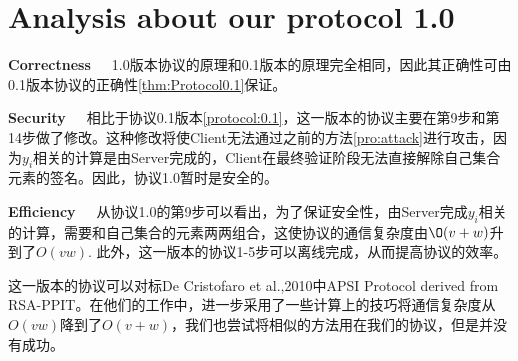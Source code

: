 \section{Analysis about our protocol 1.0}
\noindent\textbf{Correctness}~~~1.0版本协议的原理和0.1版本的原理完全相同，因此其正确性可由0.1版本协议的正确性\ref{thm:Protocol0.1}保证。

\noindent\textbf{Security}~~~相比于协议0.1版本\ref{protocol:0.1}，这一版本的协议主要在第9步和第14步做了修改。这种修改将使Client无法通过之前的方法\ref{pro:attack}进行攻击，因为$y_i$相关的计算是由Server完成的，Client在最终验证阶段无法直接解除自己集合元素的签名。因此，协议1.0暂时是安全的。

\noindent\textbf{Efficiency}~~~从协议1.0的第9步可以看出，为了保证安全性，由Server完成$y_i$相关的计算，需要和自己集合的元素两两组合，这使协议的通信复杂度由$\O(v+w)$升到了$O(vw)$. 此外，这一版本的协议1-5步可以离线完成，从而提高协议的效率。



这一版本的协议可以对标De Cristofaro et al.,2010中APSI Protocol derived from RSA-PPIT\cite{de2010practical}。在他们的工作中，进一步采用了一些计算上的技巧将通信复杂度从$O(vw)$降到了$O(v+w)$，我们也尝试将相似的方法用在我们的协议，但是并没有成功。

\newpage

